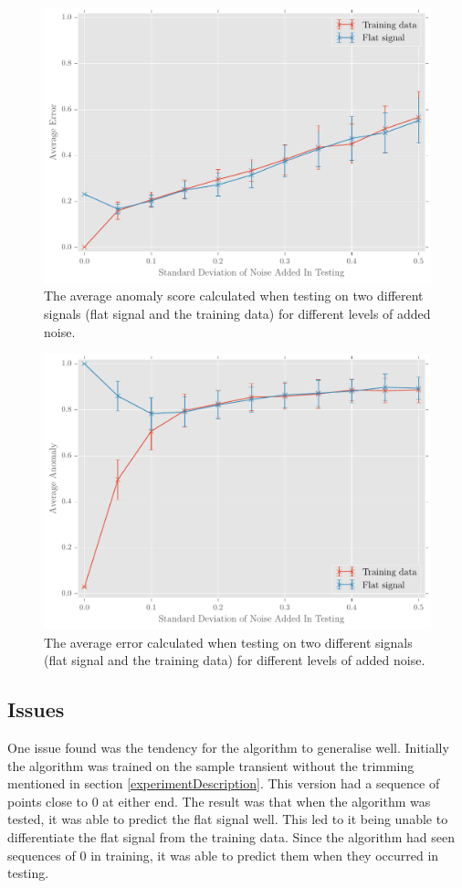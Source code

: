 \documentclass[a4paper]{jpconf}
\begin{document}
		\begin{figure}
			\centering
			\includegraphics[width=\textwidth]{averageErrorPlot.pdf}
			\caption{\label{fig:averageError}The average anomaly score calculated when testing on two different signals (flat signal and the training data) for different levels of added noise.}
		\end{figure}
		\begin{figure}
			\centering
			\includegraphics[width=\textwidth]{averageAnomalyPlot.pdf}
			\caption{\label{fig:averageAnomaly}The average error calculated when testing on two different signals (flat signal and the training data) for different levels of added noise.}
		\end{figure}
		
	\subsection{Issues}
		One issue found was the tendency for the algorithm to generalise well. Initially the algorithm was trained on the sample transient without the trimming mentioned in section \ref{experimentDescription}. This version had a sequence of points close to 0 at either end. The result was that when the algorithm was tested, it was able to predict the flat signal well. This led to it being unable to differentiate the flat signal from the training data. Since the algorithm had seen sequences of 0 in training, it was able to predict them when they occurred in testing.
		
\end{document}
